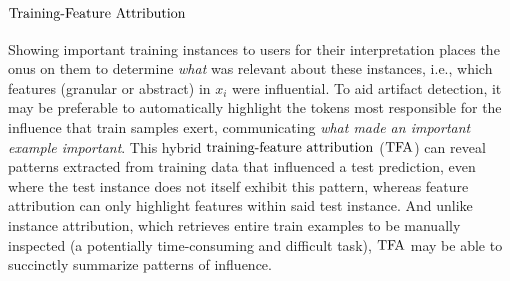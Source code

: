 \documentclass[11pt]{article}
\begin{document}
\subsection{$\text{Training-Feature Attribution}$}
Showing important training instances to users for their interpretation places the onus on them to determine \emph{what} was relevant about these instances, i.e., which %
features (granular or abstract) in $x_i$ were influential. %
To aid artifact detection, it may be preferable to automatically highlight the tokens most responsible for the influence that train samples exert,
communicating \emph{what made an important example important}. 
This hybrid $\text{training-feature attribution}$ ($\text{TFA}$) can reveal patterns extracted from training data that influenced a test prediction, even where the test instance does not itself exhibit this pattern, whereas feature attribution can only highlight features within said test instance. 
And unlike instance attribution, which retrieves entire train examples to be manually inspected (a potentially time-consuming and difficult task), $\text{TFA}$ may be able to succinctly summarize patterns of influence.
\end{document}
